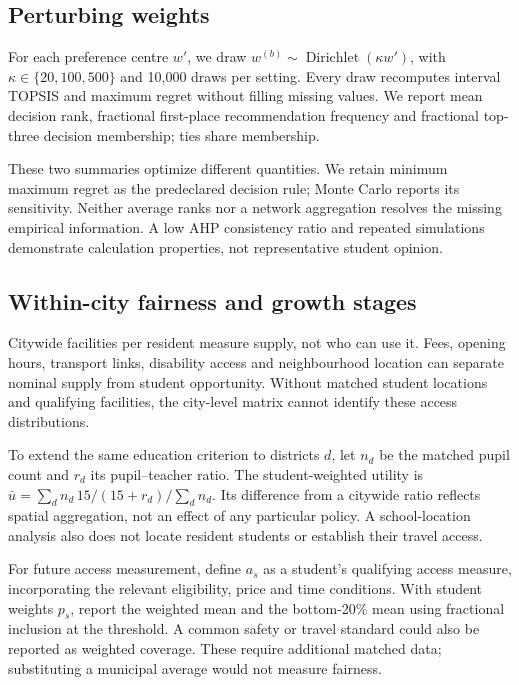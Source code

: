 \subsection{Perturbing weights}
For each preference centre $w'$, we draw
$w^{(b)}\sim\operatorname{Dirichlet}(\kappa w')$, with
$\kappa\in\{20,100,500\}$ and 10,000 draws per setting. Every draw recomputes
interval TOPSIS and maximum regret without filling missing values. We report
mean decision rank, fractional first-place recommendation frequency and
fractional top-three decision membership; ties share membership.





\MonteCarloInterpretation
These two summaries optimize different quantities. We retain minimum maximum
regret as the predeclared decision rule; Monte Carlo reports its sensitivity.
Neither average ranks nor a network aggregation resolves the missing empirical
information. A low AHP consistency ratio and repeated simulations demonstrate
calculation properties, not representative student opinion.

\subsection{Within-city fairness and growth stages}
Citywide facilities per resident measure supply, not who can use it. Fees,
opening hours, transport links, disability access and neighbourhood location
can separate nominal supply from student opportunity. Without matched student
locations and qualifying facilities, the city-level matrix cannot identify
these access distributions.

\EquityCase
To extend the same education criterion to districts $d$, let $n_d$ be the
matched pupil count and $r_d$ its pupil--teacher ratio. The student-weighted
utility is $\bar u=\sum_d n_d\,15/(15+r_d)/\sum_dn_d$.
Its difference from a citywide ratio reflects spatial aggregation, not an
effect of any particular policy. A school-location analysis also does not locate
resident students or establish their travel access.

For future access measurement, define $a_s$ as a student's qualifying access
measure, incorporating the relevant eligibility, price and time conditions.
With student weights $p_s$, report the weighted mean and the bottom-20\%
mean using fractional inclusion at the threshold. A common safety or travel
standard could also be reported as weighted coverage. These require additional
matched data; substituting a municipal average would not measure fairness.

